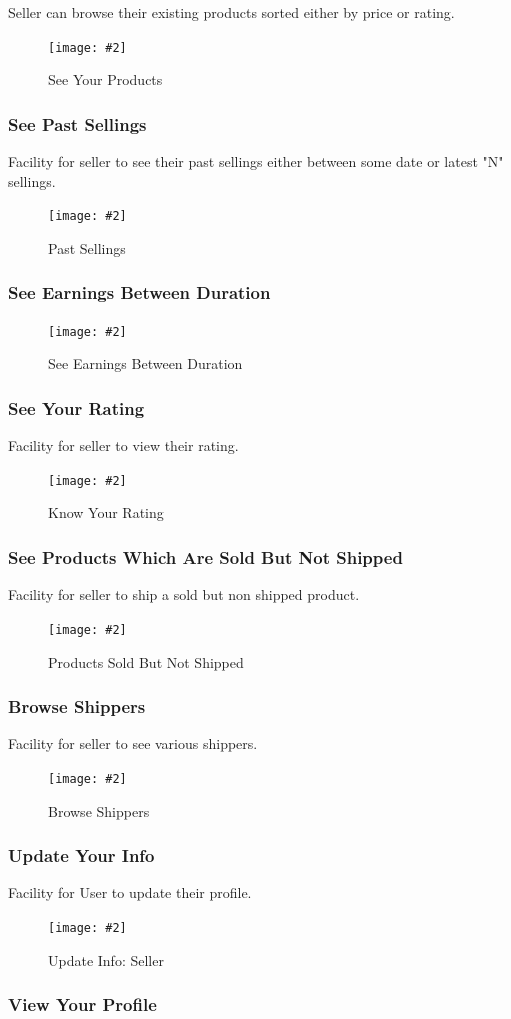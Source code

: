 \documentclass[a4paper,12pt]{article}
\newcommand{\iph}[2]{
    \texttt{[image: \#2]}
}
\newcommand{\dph}[3]{
\begin{figure}[H]
  \centering
  \iph{#1}{#2}
  \caption{#3}
\end{figure}
}
\begin{document}
Seller can browse their existing products sorted either by price or rating.

\dph{0.99}{seeprod}{See Your Products}

\subsubsection{See Past Sellings}

Facility for seller to see their past sellings either between some date or latest "N" sellings.

\dph{0.99}{psel}{Past Sellings}

\subsubsection{See Earnings Between Duration}

\dph{0.9}{ebd}{See Earnings Between Duration}


\subsubsection{See Your Rating}
Facility for seller to view their rating.

\dph{0.8}{kyr}{Know Your Rating}

\subsubsection{See Products Which Are Sold But Not Shipped}
Facility for seller to ship a sold but non shipped product. 

\dph{0.99}{ssp}{Products Sold But Not Shipped}

\subsubsection{Browse Shippers}

Facility for seller to see various shippers.

\dph{0.99}{bship}{Browse Shippers}

\subsubsection{Update Your Info}

Facility for User to update their profile.

\dph{0.99}{uppcust}{Update Info: Seller}

\subsubsection{View Your Profile}
\end{document}
